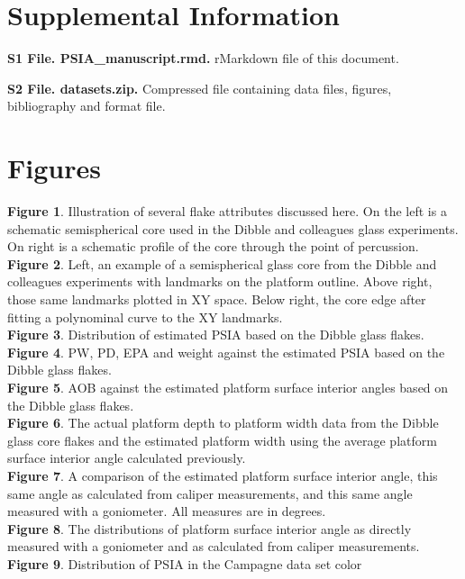 \documentclass[10pt,letterpaper]{article}
\begin{document}
\hypertarget{supplemental-information}{%
\section{Supplemental Information}\label{supplemental-information}}

\textbf{S1 File. PSIA\_manuscript.rmd.} rMarkdown file of this document.

\textbf{S2 File. datasets.zip.} Compressed file containing data files,
figures, bibliography and format file.

\hypertarget{figures}{%
\section{Figures}\label{figures}}

\textbf{Figure 1}. Illustration of several flake attributes discussed
here. On the left is a schematic semispherical core used in the Dibble
and colleagues glass experiments. On right is a schematic profile of the
core through the point of percussion.\\
\textbf{Figure 2}. Left, an example of a semispherical glass core from
the Dibble and colleagues experiments with landmarks on the platform
outline. Above right, those same landmarks plotted in XY space. Below
right, the core edge after fitting a polynominal curve to the XY
landmarks.\\
\textbf{Figure 3}. Distribution of estimated PSIA based on the Dibble
glass flakes.\\
\textbf{Figure 4}. PW, PD, EPA and weight against the estimated PSIA
based on the Dibble glass flakes.\\
\textbf{Figure 5}. AOB against the estimated platform surface interior
angles based on the Dibble glass flakes.\\
\textbf{Figure 6}. The actual platform depth to platform width data from
the Dibble glass core flakes and the estimated platform width using the
average platform surface interior angle calculated previously.\\
\textbf{Figure 7}. A comparison of the estimated platform surface
interior angle, this same angle as calculated from caliper measurements,
and this same angle measured with a goniometer. All measures are in
degrees.\\
\textbf{Figure 8}. The distributions of platform surface interior angle
as directly measured with a goniometer and as calculated from caliper
measurements.\\
\textbf{Figure 9}. Distribution of PSIA in the Campagne data set color
\end{document}
